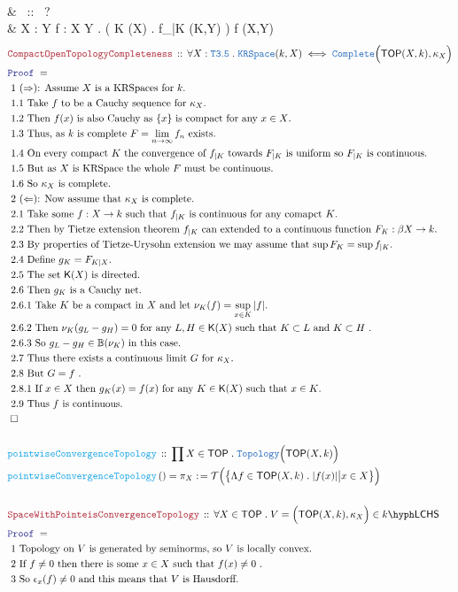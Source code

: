 \documentclass[12pt]{scrartcl}
\newcommand{\TYPE}[1]{\textcolor{NavyBlue}{\mathtt{#1}}}
\newcommand{\FUNC}[1]{\textcolor{Cerulean}{\mathtt{#1}}}
\newcommand{\LOGIC}[1]{\textcolor{Blue}{\mathtt{#1}}}
\newcommand{\THM}[1]{\textcolor{Maroon}{\mathtt{#1}}}
\renewcommand{\.}{\; . \;}
\newcommand{\de}{: \kern 0.1pc =}
\newcommand{\Act}[1]{\left( #1 \right)}
\newcommand{\Theorem}[2]{& \THM{#1} \, :: \, #2 \\ & \Proof = \\ }
\newcommand{\DeclareType}[2]{& \TYPE{#1} \, :: \, #2 \\}
\newcommand{\DefineType}[3]{& #1 : \TYPE{#2} \iff #3 \\}
\newcommand{\DeclareFunc}[2]{& \FUNC{#1} \, :: \, #2 \\}
\newcommand{\DefineNamedFunc}[4]{&  \FUNC{#1}\Act{#2} = #3 \de #4 \\}
\newcommand{\Page}[1]{ \begin{align*} #1 \end{align*}   }
\newcommand{\Explain}[1]{& \text{#1.} \\}
\newcommand{\Imply}{\Rightarrow}
\newcommand{\QED}{\; \square}
\newcommand{\EndProof}{& \QED \\}
\newcommand{\Proof}{\LOGIC{Proof} \; }
\newcommand{\Top}{\TYPE{Topology}}
\newcommand{\TOP}{\mathsf{TOP}}
\newcommand{\T}{\mathcal{T}}
\newcommand{\Cell}{\mathbb{B}}
\newcommand{\Complete}{\TYPE{Complete}}
\newcommand{\K}{\mathsf{K}}
\newcommand{\LCHS}[1]{{#1}\hyph\mathsf{LCHS}}
\begin{document}
{	\\
	\DeclareType{KRSpace}{\TOP \to ?\TOP}
	\DefineType{X}{KRSpace}
	{
		\Lambda Y  \in \TOP		
		\forall f : X \to Y \. 
		\Big( \forall K \in \K(X) \. f_{|K} \in \TOP(K,Y) \Big)
		\Imply
		f \in \TOP(X,Y)
	}
}\Page{
	\Theorem{CompactOpenTopologyCompleteness}
	{
		\forall X : \TYPE{T3.5} \.
		\TYPE{KRSpace}(k,X)
		\iff
		\Complete\Big( \TOP(X,k),\kappa_X \Big)
	}
	\Explain{ 1 $(\Rightarrow)$: Assume $X$ is a KRSpaces for $k$}
	\Explain{ 1.1 Take $f$ to be a Cauchy sequence for $\kappa_X$}
	\Explain{ 1.2 Then $f(x)$ is also Cauchy as $\{x\}$ is compact for any $x \in X$}
	\Explain{ 1.3 Thus, as $k$ is complete $F = \lim_{n \to \infty} f_{n}$ exists}
	\Explain{ 1.4 On every compact $K$ the convergence of $f_{|K}$ towards $F_{|K}$ is uniform
		so $F_{|K}$ is continuous}
	\Explain{ 1.5 But as $X$ is KRSpace the whole $F$ must be continuous}
	\Explain{ 1.6 So $\kappa_X$ is complete}
	\Explain{ 2 $(\Leftarrow)$: Now assume that $\kappa_X$ is complete}
	\Explain{ 2.1 Take some $f: X \to k$ such that $f_{|K}$ is continuous for any comapct $K$}
	\Explain{ 2.2 Then by Tietze extension theorem  $f_{|K}$ can extended
		to a continuous function $F_K : \beta X \to k$}
	\Explain{ 2.3 By properties of Tietze-Urysohn extension we may assume that $\sup F_K = \sup f_{|K}$}
	\Explain{ 2.4 Define $g_K = F_{K|X}$}
	\Explain{ 2.5 The set $\K(X)$ is directed}
	\Explain{ 2.6 Then $g_K$ is a Cauchy net}
	\Explain{ 2.6.1 Take $K$ be a compact in $X$ and let $\nu_K(f) = \sup_{x \in K} |f|$}
	\Explain{ 2.6.2 Then 
		$\nu_K(g_L - g_H) = 0$ for any $L,H \in \K(X)$ such that $K \subset L$ and $K \subset H$ }
	\Explain{ 
		2.6.3 So $g_L - g_H \in \Cell(\nu_K)$ in this case}
	\Explain{
		2.7 Thus there exists a continuous limit $G$ for $\kappa_X$}
	\Explain{
		2.8 But $G = f$
	}
	\Explain{ 2.8.1
		If $x \in X$ then $g_K(x) = f(x)$ for any $K \in \K(X)$ such that $x \in K$}
	\Explain{ 2.9
		Thus $f$ is continuous}
	\EndProof
	\\
	\DeclareFunc{pointwiseConvergenceTopology}
	{
		\prod X \in \TOP \. \Top\Big(\TOP(X,k)\Big)
	}
	\DefineNamedFunc{pointwiseConvergenceTopology}{}{\pi_X}
	{
		\T \Big( 
			\big\{ \Lambda f \in \TOP(X,k) \.  |f(x)| \big| x \in X \big\} \Big)		
	}
	\\
	\Theorem{SpaceWithPointeisConvergenceTopology}
	{
		\forall X \in \TOP \. V = \Big( \TOP(X,k), \kappa_X \Big) \in \LCHS{k}
	}
	\Explain{ 1 Topology on $V$ is generated by seminorms, so $V$ is locally convex}
	\Explain{
		2 If $f \neq 0$ then there is some $x \in X$ such that $f(x) \neq 0$ 
	}
	\Explain{ 3 So $\epsilon_x(f) \neq 0$  and this means that $V$ is Hausdorff}
}
\end{document}
